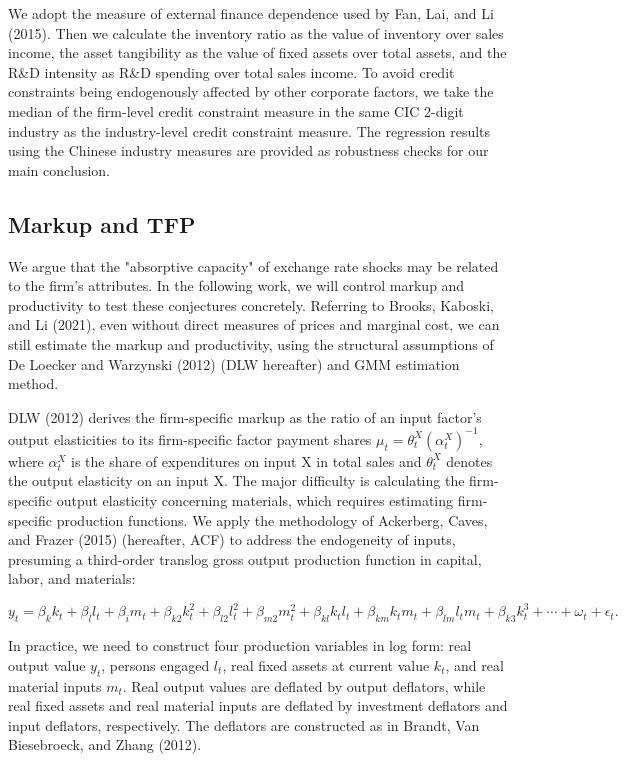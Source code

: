 We adopt the measure of external finance dependence used by Fan, Lai, and Li (2015)\cite{fan-lai-li2015}. Then we calculate the inventory ratio as the value of inventory over sales income, the asset tangibility as the value of fixed assets over total assets, and the R\&D intensity as R\&D spending over total sales income. To avoid credit constraints being endogenously affected by other corporate factors, we take the median of the firm-level credit constraint measure in the same CIC 2-digit industry as the industry-level credit constraint measure. The regression results using the Chinese industry measures are provided as robustness checks for our main conclusion.

\subsection{Markup and TFP}\label{sec-4.2.3}

We argue that the "absorptive capacity" of exchange rate shocks may be related to the firm's attributes. In the following work, we will control markup and productivity to test these conjectures concretely. Referring to Brooks, Kaboski, and Li (2021)\cite{bkl2021}, even without direct measures of prices and marginal cost, we can still estimate the markup and productivity, using the structural assumptions of De Loecker and Warzynski\cite{dlw2012} (2012) (DLW hereafter) and GMM estimation method.

DLW (2012)\cite{dlw2012} derives the firm-specific markup as the ratio of an input factor's output elasticities to its firm-specific factor payment shares $\mu_{t}=\theta_{t}^{X}\left(\alpha_{t}^{X}\right)^{-1}$, where $\alpha_{t}^{X}$ is the share of expenditures on input X in total sales and $\theta^X_t$ denotes the output elasticity on an input X. The major difficulty is calculating the firm-specific output elasticity concerning materials, which requires estimating firm-specific production functions. We apply the methodology of Ackerberg, Caves, and Frazer (2015)\cite{acf2015} (hereafter, ACF) to address the endogeneity of inputs, presuming a third-order translog gross output production function in capital, labor, and materials:

$$
y_{t}= \beta_{k} k_{t}+\beta_{l} l_{t}+\beta_{i} m_{t}+\beta_{k 2} k_{t}^{2}+\beta_{l 2} l_{t}^{2}+\beta_{m 2} m_{t}^{2}+\beta_{k l} k_{ t} l_{t}+\beta_{k m} k_{t} m_{t}+\beta_{l m} l_{t} m_{t}+\beta_{k 3} k_{t}^{3}+\cdots+\omega_{t}+\epsilon_{t}.
$$

In practice, we need to construct four production variables in log form: real output value $y_t$, persons engaged $l_t$, real fixed assets at current value $k_t$, and real material inputs $m_t$. Real output values are deflated by output deflators, while real fixed assets and real material inputs are deflated by investment deflators and input deflators, respectively. The deflators are constructed as in Brandt, Van Biesebroeck, and Zhang (2012)\cite{brandt2012}.

